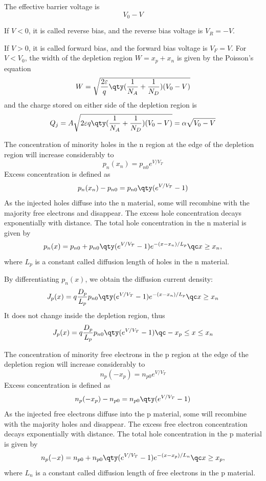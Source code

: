 \documentclass[a4paper,12pt]{article}
\begin{document}
The effective barrier voltage is
\[V_0-V\]
\bit
\item If $V<0$, it is called reverse bias, and the reverse bias voltage is $V_R=-V$.
\item If $V>0$, it is called forward bias, and the forward bias voltage is $V_F=V$.
\eit
{}
For $V<V_0$, the width of the depletion region $W=x_p+x_n$ is given by the Poisson's equation
\[W=\sqrt{\frac{2\varepsilon}{q}\qty(\frac{1}{N_A}+\frac{1}{N_D})(V_0-V)}\]
and the charge stored on either side of the depletion region is
\[Q_j=A\sqrt{2\varepsilon q\qty(\frac{1}{N_A}+\frac{1}{N_D})(V_0-V)}=\alpha\sqrt{V_0-V}\]
\bit
\item The concentration of minority holes in the n region at the edge of the depletion region will increase considerably to
\[p_n(x_n)=p_{n0}e^{V/V_T}\]
Excess concentration is defined as
\[p_n(x_n)-p_{n0}=p_{n0}\qty(e^{V/V_T}-1)\]
As the injected holes diffuse into the n material, some will recombine with the majority free electrons and disappear. The excess hole concentration decays exponentially with distance. The total hole concentration in the n material is given by
\[p_n(x)=p_{n0}+p_{n0}\qty(e^{V/V_T}-1)e^{-(x-x_n)/L_p}\qc x\ge x_n,\]
where $L_p$ is a constant called diffusion length of holes in the n material.

By differentiating $p_n(x)$, we obtain the diffusion current density:
\[J_p(x)=q\frac{D_p}{L_p}p_{n0}\qty(e^{V/V_T}-1)e^{-(x-x_n)/L_p}\qc x\ge x_n\]
It does not change inside the depletion region, thus
\[J_p(x)=q\frac{D_p}{L_p}p_{n0}\qty(e^{V/V_T}-1)\qc -x_p\le x\le x_n\]
\item The concentration of minority free electrons in the p region at the edge of the depletion region will increase considerably to
\[n_p(-x_p)=n_{p0}e^{V/V_T}\]
Excess concentration is defined as
\[n_p(-x_p)-n_{p0}=n_{p0}\qty(e^{V/V_T}-1)\]
As the injected free electrons diffuse into the p material, some will recombine with the majority holes and disappear. The excess free electron concentration decays exponentially with distance. The total hole concentration in the p material is given by
\[n_p(-x)=n_{p0}+n_{p0}\qty(e^{V/V_T}-1)e^{-(x-x_p)/L_n}\qc x\ge x_p,\]
where $L_n$ is a constant called diffusion length of free electrons in the p material.
\end{document}
